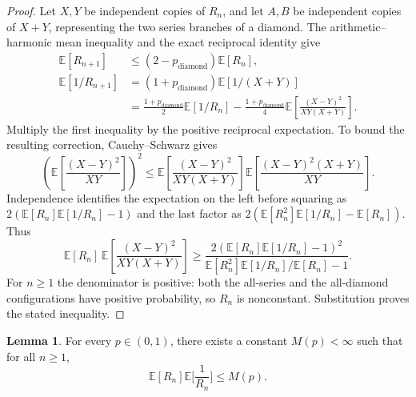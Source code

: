 \documentclass{article}
\theoremstyle{plain}
\theoremstyle{definition}
\newtheorem{lemma}[theorem]{Lemma}
\begin{document}
\begingroup\color{red}
\begin{proof}
Let $X,Y$ be independent copies of $R_n$, and let $A,B$ be independent
copies of $X+Y$, representing the two series branches of a diamond.
The arithmetic--harmonic mean inequality and the exact reciprocal
identity give
\begin{align*}
\mathbb E[R_{n+1}]&\le(2-p_{\mathrm{diamond}})\mathbb E[R_n],\\
\mathbb E[1/R_{n+1}]
&=(1+p_{\mathrm{diamond}})\mathbb E[1/(X+Y)]\\
&=\frac{1+p_{\mathrm{diamond}}}{2}\mathbb E[1/R_n]
-\frac{1+p_{\mathrm{diamond}}}{4}
\mathbb E\left[\frac{(X-Y)^2}{XY(X+Y)}\right].
\end{align*}
Multiply the first inequality by the positive reciprocal expectation.
To bound the resulting correction, Cauchy--Schwarz gives
\[
\left(\mathbb E\left[\frac{(X-Y)^2}{XY}\right]\right)^2
\le
\mathbb E\left[\frac{(X-Y)^2}{XY(X+Y)}\right]
\mathbb E\left[\frac{(X-Y)^2(X+Y)}{XY}\right].
\]
Independence identifies the expectation on the left before squaring as
$2(\mathbb E[R_n]\mathbb E[1/R_n]-1)$ and the last factor as
$2(\mathbb E[R_n^2]\mathbb E[1/R_n]-\mathbb E[R_n])$.
Thus
\[
\mathbb E[R_n]\,
\mathbb E\left[\frac{(X-Y)^2}{XY(X+Y)}\right]
\ge
\frac{2(\mathbb E[R_n]\mathbb E[1/R_n]-1)^2}
{\mathbb E[R_n^2]\mathbb E[1/R_n]/\mathbb E[R_n]-1}.
\]
For $n\ge1$ the denominator is positive: both the all-series and the
all-diamond configurations have positive probability, so $R_n$ is
nonconstant. Substitution proves the stated inequality.
\end{proof}
\endgroup{}





\begin{lemma}\label{lem:uniform_product}
For every $p\in(0,1)$, there exists a constant $M(p)<\infty$ such that for all $n\ge 1$,
\[
\mathbb E[R_n]\mathbb E\Big[\frac{1}{R_n}\Big]\le M(p).
\]
\end{lemma}
\end{document}
